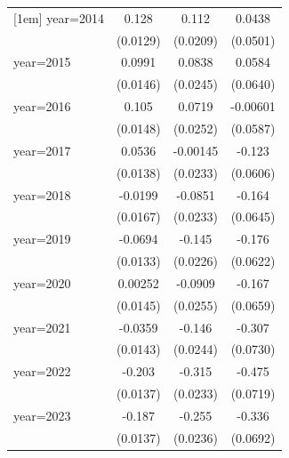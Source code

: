 \begin{table}[htbp]
\begin{tabular}{l*{3}{c}}
[1em]
year=2014           &       0.128\sym{***}&       0.112\sym{***}&      0.0438         \\
                    &    (0.0129)         &    (0.0209)         &    (0.0501)         \\
[1em]
year=2015           &      0.0991\sym{***}&      0.0838\sym{***}&      0.0584         \\
                    &    (0.0146)         &    (0.0245)         &    (0.0640)         \\
[1em]
year=2016           &       0.105\sym{***}&      0.0719\sym{***}&    -0.00601         \\
                    &    (0.0148)         &    (0.0252)         &    (0.0587)         \\
[1em]
year=2017           &      0.0536\sym{***}&    -0.00145         &      -0.123\sym{**} \\
                    &    (0.0138)         &    (0.0233)         &    (0.0606)         \\
[1em]
year=2018           &     -0.0199         &     -0.0851\sym{***}&      -0.164\sym{**} \\
                    &    (0.0167)         &    (0.0233)         &    (0.0645)         \\
[1em]
year=2019           &     -0.0694\sym{***}&      -0.145\sym{***}&      -0.176\sym{***}\\
                    &    (0.0133)         &    (0.0226)         &    (0.0622)         \\
[1em]
year=2020           &     0.00252         &     -0.0909\sym{***}&      -0.167\sym{**} \\
                    &    (0.0145)         &    (0.0255)         &    (0.0659)         \\
[1em]
year=2021           &     -0.0359\sym{**} &      -0.146\sym{***}&      -0.307\sym{***}\\
                    &    (0.0143)         &    (0.0244)         &    (0.0730)         \\
[1em]
year=2022           &      -0.203\sym{***}&      -0.315\sym{***}&      -0.475\sym{***}\\
                    &    (0.0137)         &    (0.0233)         &    (0.0719)         \\
[1em]
year=2023           &      -0.187\sym{***}&      -0.255\sym{***}&      -0.336\sym{***}\\
                    &    (0.0137)         &    (0.0236)         &    (0.0692)         \\

\end{tabular}
\end{table}
